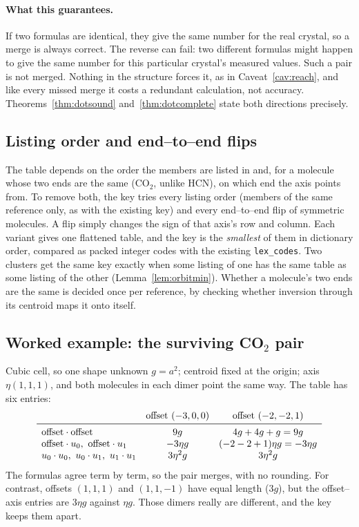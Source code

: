 \documentclass[11pt]{article}
\theoremstyle{definition}
\begin{document}
\paragraph{What this guarantees.} If two formulas are identical, they give the
same number for the real crystal, so a merge is always correct. The reverse can
fail: two different formulas might happen to give the same number for this
particular crystal's measured values. Such a pair is not merged. Nothing in the
structure forces it, as in Caveat~\ref{cav:reach}, and like every missed merge
it costs a redundant calculation, not accuracy.
Theorems~\ref{thm:dotsound} and~\ref{thm:dotcomplete} state both directions
precisely.

\subsection{Listing order and end--to--end flips}

The table depends on the order the members are listed in and, for a molecule
whose two ends are the same (CO$_2$, unlike HCN), on which end the axis points
from. To remove both, the key tries every listing order (members of the same
reference only, as with the existing key) and every end--to--end flip of
symmetric molecules. A flip simply changes the sign of that axis's row and
column. Each variant gives one flattened table, and the key is the
\emph{smallest} of them in dictionary order, compared as packed integer codes
with the existing \texttt{lex\_codes}. Two clusters get the same key exactly
when some listing of one has the same table as some listing of the other
(Lemma~\ref{lem:orbitmin}). Whether a molecule's two ends
are the same is decided once per reference, by checking whether inversion
through its centroid maps it onto itself.

\subsection{Worked example: the surviving CO$_2$ pair}

Cubic cell, so one shape unknown $g=a^2$; centroid fixed at the origin; axis
$\eta(1,1,1)$, and both molecules in each dimer point the same way. The table
has six entries:
\[
\begin{array}{lcc}
 & \text{offset }(-3,0,0) & \text{offset }(-2,-2,1)\\\midrule
\text{offset}\cdot\text{offset} & 9g & 4g+4g+g=9g\\
\text{offset}\cdot u_0,\ \text{offset}\cdot u_1 & -3\eta g & (-2-2+1)\eta g=-3\eta g\\
u_0\cdot u_0,\ u_0\cdot u_1,\ u_1\cdot u_1 & 3\eta^2g & 3\eta^2g
\end{array}
\]
The formulas agree term by term, so the pair merges, with no rounding. For
contrast, offsets $(1,1,1)$ and $(1,1,-1)$ have equal length ($3g$), but the
offset--axis entries are $3\eta g$ against $\eta g$. Those dimers really are
different, and the key keeps them apart.
\end{document}
